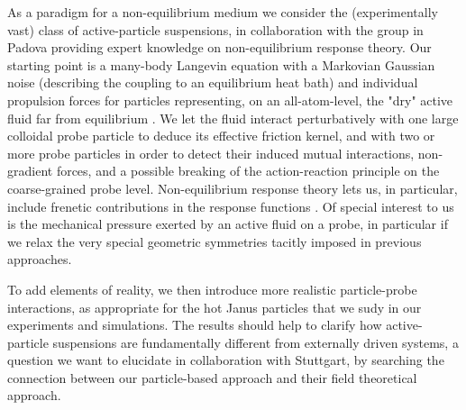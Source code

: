 \begin{workpackage}
\begin{tasklist}

\begin{task}[title=Non-Equilibrium Equations of State (NEOS),id=task1,PM=8,lead=Leipzig,
partners={Padova,USTUTT},wphases=0-48!0.3]
As a paradigm for a non-equilibrium medium we consider the (experimentally vast) class of
active-particle suspensions, in collaboration with the group in Padova providing expert knowledge on 
non-equilibrium response theory.
%
Our starting point is a many-body Langevin equation with a Markovian Gaussian noise
(describing the coupling to an equilibrium heat bath) and individual propulsion forces for
particles representing, on an all-atom-level, the "dry" active fluid far from equilibrium \cite{solon-etal:2015}. 
%
We let the fluid interact perturbatively with one large colloidal probe particle to
deduce its effective friction kernel, and with two or more probe particles in order to
detect their induced mutual interactions, non-gradient forces, and a possible breaking of
the action-reaction principle on the coarse-grained probe level.  
%
Non-equilibrium response theory lets us, in particular, include frenetic contributions in the response 
functions \cite{baiesi-wynants:2009}.
%
Of special interest to us is the mechanical pressure exerted by an active fluid on a probe, 
in particular if we relax the very special geometric symmetries tacitly imposed in previous approaches.

To add elements of reality, we then introduce more realistic particle-probe interactions, as appropriate for the hot 
Janus particles that we sudy in our experiments and simulations.
%
The results should help to clarify how active-particle suspensions are fundamentally different from externally driven systems, 
a question we want to elucidate in collaboration with Stuttgart, by searching   
the connection between our particle-based approach and their field theoretical approach.

\end{task}


\end{tasklist}
\end{workpackage}

